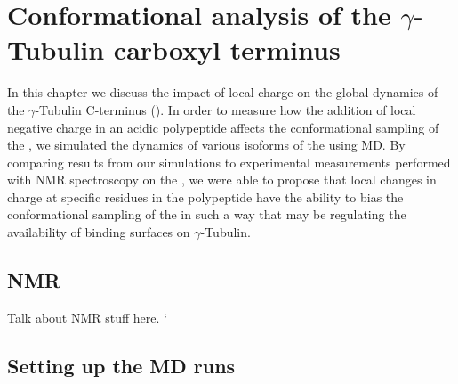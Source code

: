 \chapter{Conformational analysis of the $\gamma$-Tubulin carboxyl terminus}

In this chapter we discuss the impact of local charge on the global dynamics of the $\gamma$-Tubulin C-terminus (\gct{}). In order to measure how the addition of local negative charge in an acidic polypeptide affects the conformational sampling of the \gct{}, we simulated the dynamics of various isoforms of the \gct{} using MD. By comparing results from our simulations to experimental measurements performed with NMR spectroscopy on the \gct{}, we were able to propose that local changes in charge at specific residues in the polypeptide have the ability to bias the conformational sampling of the \gct{} in such a way that may be regulating the availability of binding surfaces on $\gamma$-Tubulin.

\section{NMR}
Talk about NMR stuff here.
`
\section{Setting up the MD runs}

